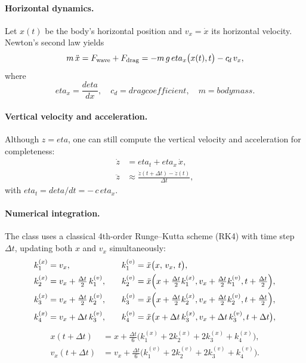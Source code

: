 \documentclass[journal,10pt,twocolumn]{IEEEtran}
\def\eta{eta}%
\def\partial{d}%
\def\text#1{#1}%
\def\;{ }%
\begin{document}
    \paragraph{Horizontal dynamics.}
    Let $x(t)$ be the body's horizontal position and $v_x = \dot x$ its horizontal velocity. Newton's second law yields
    \begin{equation}
        m\,\ddot x \;=\; F_{\rm wave} + F_{\rm drag}
        \;=\;-m\,g\,\eta_x\bigl(x(t),t\bigr)
        \;-\;c_{\!d}\,v_x,
        \label{eq:tracker_motion}
    \end{equation}
    where
    \[
        \eta_x = \frac{\partial \eta}{\partial x},
        \quad
        c_{\!d} = \text{drag coefficient},
        \quad
        m = \text{body mass}.
    \]

    \paragraph{Vertical velocity and acceleration.}
    Although $z=\eta$, one can still compute the vertical velocity and acceleration for completeness:
    \begin{align}
        \dot z &= \eta_t + \eta_x\,\dot x,
        \\
        \ddot z &\approx \frac{\dot z(t+\Delta t)-\dot z(t)}{\Delta t},
    \end{align}
    with $\eta_t = \partial\eta/\partial t = -\,c\,\eta_x$.

    \paragraph{Numerical integration.}
    The class uses a classical 4th-order Runge--Kutta scheme (RK4) with time step $\Delta t$, updating both $x$ and $v_x$ simultaneously:
    \[
        \begin{aligned}
            k_{1}^{(x)} &= v_x,
            &\quad
            k_{1}^{(v)} &= \ddot x\bigl(x,\,v_x,\,t\bigr),\\
            k_{2}^{(x)} &= v_x + \tfrac{\Delta t}{2}\,k_{1}^{(v)},
            &\quad
            k_{2}^{(v)} &= \ddot x\Bigl(x + \tfrac{\Delta t}{2}k_{1}^{(x)},\;v_x + \tfrac{\Delta t}{2}k_{1}^{(v)},\;t+\tfrac{\Delta t}{2}\Bigr),\\
            k_{3}^{(x)} &= v_x + \tfrac{\Delta t}{2}\,k_{2}^{(v)},
            &\quad
            k_{3}^{(v)} &= \ddot x\Bigl(x + \tfrac{\Delta t}{2}k_{2}^{(x)},\;v_x + \tfrac{\Delta t}{2}k_{2}^{(v)},\;t+\tfrac{\Delta t}{2}\Bigr),\\
            k_{4}^{(x)} &= v_x + \Delta t\,k_{3}^{(v)},
            &\quad
            k_{4}^{(v)} &= \ddot x\bigl(x + \Delta t\,k_{3}^{(x)},\;v_x + \Delta t\,k_{3}^{(v)},\;t+\Delta t\bigr),
        \end{aligned}
    \]
    \[
        \begin{aligned}
            x(t+\Delta t) &= x + \tfrac{\Delta t}{6}\bigl(k_{1}^{(x)} + 2k_{2}^{(x)} + 2k_{3}^{(x)} + k_{4}^{(x)}\bigr),\\
            v_x(t+\Delta t) &= v_x + \tfrac{\Delta t}{6}\bigl(k_{1}^{(v)} + 2k_{2}^{(v)} + 2k_{3}^{(v)} + k_{4}^{(v)}\bigr).
        \end{aligned}
    \]
\end{document}
